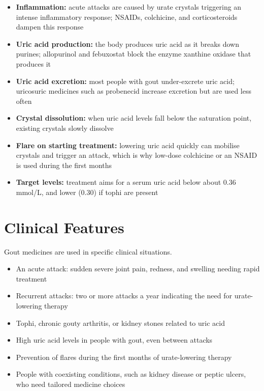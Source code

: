 \begin{itemize}
    \item \textbf{Inflammation:} acute attacks are caused by urate crystals triggering an intense inflammatory response; NSAIDs, colchicine, and corticosteroids dampen this response
    \item \textbf{Uric acid production:} the body produces uric acid as it breaks down purines; allopurinol and febuxostat block the enzyme xanthine oxidase that produces it
    \item \textbf{Uric acid excretion:} most people with gout under-excrete uric acid; uricosuric medicines such as probenecid increase excretion but are used less often
    \item \textbf{Crystal dissolution:} when uric acid levels fall below the saturation point, existing crystals slowly dissolve
    \item \textbf{Flare on starting treatment:} lowering uric acid quickly can mobilise crystals and trigger an attack, which is why low-dose colchicine or an NSAID is used during the first months
    \item \textbf{Target levels:} treatment aims for a serum uric acid below about 0.36 mmol/L, and lower (0.30) if tophi are present
\end{itemize}

\section*{Clinical Features}
Gout medicines are used in specific clinical situations.

\begin{itemize}
    \item An acute attack: sudden severe joint pain, redness, and swelling needing rapid treatment
    \item Recurrent attacks: two or more attacks a year indicating the need for urate-lowering therapy
    \item Tophi, chronic gouty arthritis, or kidney stones related to uric acid
    \item High uric acid levels in people with gout, even between attacks
    \item Prevention of flares during the first months of urate-lowering therapy
    \item People with coexisting conditions, such as kidney disease or peptic ulcers, who need tailored medicine choices
\end{itemize}

